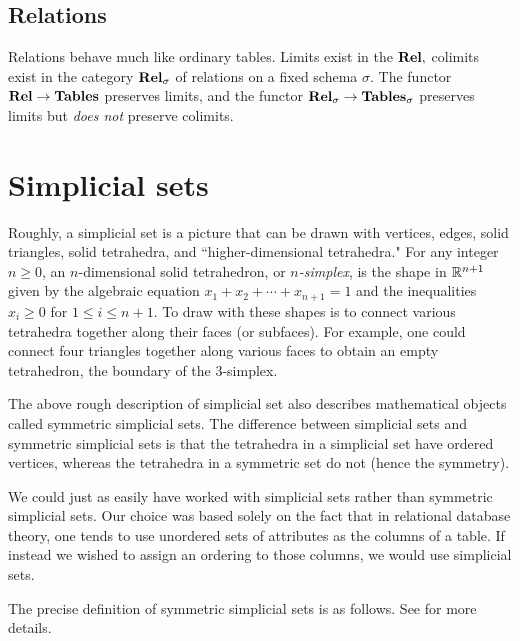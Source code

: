 \documentclass{amsart}
\def\Tables{{\bf Tables}}
\def\Rel{{\bf Rel}}
\begin{document}
\subsection{Relations}

Relations behave much like ordinary tables.  Limits exist in the $\Rel,$ colimits exist in the category $\Rel_\sigma$ of relations on a fixed schema $\sigma$.  The functor $\Rel\to\Tables$ preserves limits, and the functor $\Rel_\sigma\to\Tables_\sigma$ preserves limits but {\em does not} preserve colimits.

\section{Simplicial sets}

Roughly, a simplicial set is a picture that can be drawn with vertices, edges, solid triangles, solid tetrahedra, and ``higher-dimensional tetrahedra."  For any integer $n\geq 0$, an $n$-dimensional solid tetrahedron, or {\em $n$-simplex}, is the shape in ${\mathbb R}^{n+1}$ given by the algebraic equation $x_1+x_2+\cdots+x_{n+1}=1$ and the inequalities $x_i\geq 0$ for $1\leq i\leq n+1$.  To draw with these shapes is to connect various tetrahedra together along their faces (or subfaces).  For example, one could connect four triangles together along various faces to obtain an empty tetrahedron, the boundary of the 3-simplex.

The above rough description of simplicial set also describes mathematical objects called symmetric simplicial sets.  The difference between simplicial sets and symmetric simplicial sets is that the tetrahedra in a simplicial set have ordered vertices, whereas the tetrahedra in a symmetric set do not (hence the symmetry).

We could just as easily have worked with simplicial sets rather than symmetric simplicial sets.  Our choice was based solely on the fact that in relational database theory, one tends to use unordered sets of attributes as the columns of a table.  If instead we wished to assign an ordering to those columns, we would use simplicial sets.    

The precise definition of symmetric simplicial sets is as follows.  See \cite{Grandis} for more details.
\end{document}
